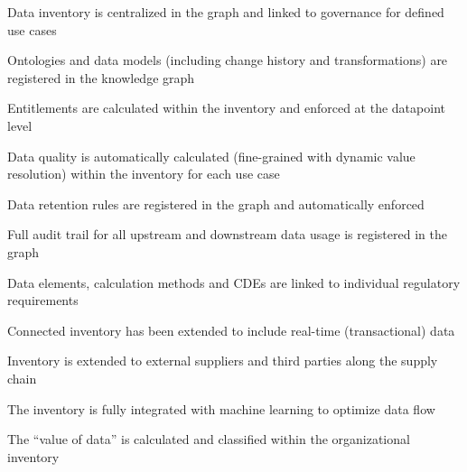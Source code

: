 \kgmmscoringlevelThree

\begin{scoring}

  \item Data inventory is centralized in the graph and linked to governance for defined use cases
  \item Ontologies and data models (including change history and transformations) are registered in the knowledge graph
  \item Entitlements are calculated within the inventory and enforced at the datapoint level
  \item Data quality is automatically calculated (fine-grained with dynamic value resolution) within the inventory
        for each use case
  \item Data retention rules are registered in the graph and automatically enforced
  \item Full audit trail for all upstream and downstream data usage is registered in the graph
  \item Data elements, calculation methods and CDEs are linked to individual regulatory requirements

\end{scoring}

\kgmmscoringlevelFour

\begin{scoring}

  \item Connected inventory has been extended to include real-time (transactional) data
  \item Inventory is extended to external suppliers and third parties along the supply chain
  \item The inventory is fully integrated with machine learning to optimize data flow
  \item The “value of data” is calculated and classified within the organizational inventory

\end{scoring}
